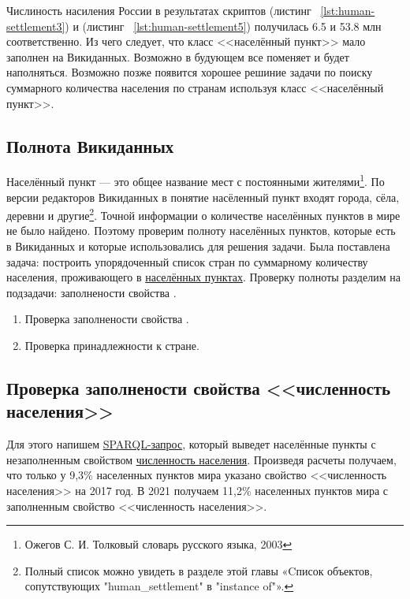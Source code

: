 Числиность насиления России в результатах скриптов (листинг ~\protect\ref{lst:human-settlement3}) и (листинг ~\protect\ref{lst:human-settlement5}) получилась \num{6,5} и \num{53,8} млн соответственно. Из чего следует, что класс <<населённый пункт>> мало заполнен на Викиданных. Возможно в будующем все поменяет и будет наполняться. Возможно позже появится хорошее решиние задачи по поиску суммарного количества населения по странам используя класс <<населённый пункт>>.

\subsection{Полнота Викиданных}

Населённый пункт — это общее название мест с постоянными жителями\footnote {Ожегов С. И. Толковый словарь русского языка, 2003}. По версии редакторов Викиданных в понятие насёленный пункт входят города, сёла, деревни и другие\footnote{Полный список можно увидеть в разделе этой главы «Cписок объектов, сопутствующих "human\_settlement" в "instance of"».}.
Точной информации о количестве населённых пунктов в мире не было найдено. Поэтому проверим полноту населённых пунктов, которые есть в Викиданных и которые использовались для решения задачи. Была поставлена задача: построить упорядоченный список стран по суммарному количеству населения, проживающего в \href{http://www.wikidata.org/entity/Q486972}{населённых пунктах}. Проверку полноты разделим на подзадачи: заполнености свойства .

\begin{enumerate} 
  \item Проверка заполнености свойства .
  \item Проверка принадлежности к стране.
\end{enumerate}

\subsection{Проверка заполнености свойства <<численность населения>> }

Для этого напишем \href{https://w.wiki/4FUz}{SPARQL-запрос}\footnotemark, который выведет населённые пункты с незаполненным свойством \href{http://www.wikidata.org/entity/P1082}{численность населения}. 
Произведя расчеты получаем, что только у 9,3\% населенных пунктов мира указано свойство <<численность населения>> на 2017 год. В 2021 получаем 11,2\% населенных пунктов мира с заполненным свойство <<численность населения>>.


